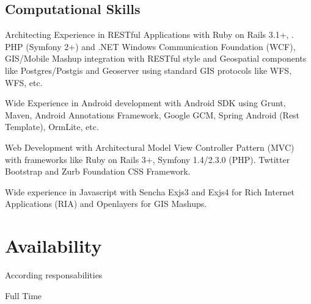 \documentclass[11pt,letterpaper,roman]{moderncv}
\begin{document}
	\subsection{Computational Skills}

		{Architecting Experience in RESTful Applications with Ruby on Rails 3.1+, . PHP (Symfony 2+) and .NET Windows
		Communication Foundation (WCF), GIS/Mobile Mashup
		integration with RESTful style and Geospatial components like Postgres/Postgis
		and Geoserver using standard GIS protocols like WFS, WFS, etc.}

		{Wide Experience in Android development with Android
		SDK using Grunt, Maven, Android Annotations Framework, Google GCM, Spring Android (Rest Template), OrmLite, etc.}

		{Web Development with Architectural Model View
		Controller Pattern (MVC) with frameworks like Ruby on Rails 3+, Symfony 1.4/2.3.0 (PHP). Twtitter Bootstrap and Zurb Foundation CSS Framework.}

		{Wide experience in Javascript with Sencha
		Exjs3 and Exjs4 for Rich Internet Applications (RIA) and Openlayers for GIS
		Mashups.}


\section{Availability}
	{According responsabilities}

	{Full Time}
\end{document}
